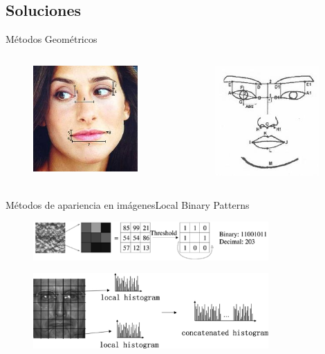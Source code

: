 \documentclass{beamer}
\begin{document}
    \subsection{Soluciones}
        \begin{frame}{Métodos Geométricos}
               \begin{columns}[onlytextwidth]
    		  		\begin{column}{0.5\textwidth}
      				\begin{figure}[bt]
        					\centering
                			\includegraphics[width=4cm]{imagenes/geo1.jpg}
            			\end{figure}	
      			\end{column}
			    \begin{column}{0.5\textwidth}
      				\begin{figure}[bt]
			        		\centering
            			    \includegraphics[width=4cm]{imagenes/geo2.jpg}
            			\end{figure}	
      			\end{column}
			   \end{columns}      			
        \end{frame}
    
        \begin{frame}{Métodos de apariencia en imágenes}{Local Binary Patterns}
            \begin{figure}[bt]
        		\centering
                \includegraphics[width=9cm]{imagenes/lbp.pdf}
            \end{figure}	

            \begin{figure}[bt]
        		\centering
                \includegraphics[width=9cm]{imagenes/lbp_histogram.png}
            \end{figure}	  
        \end{frame}
        
\end{document}
